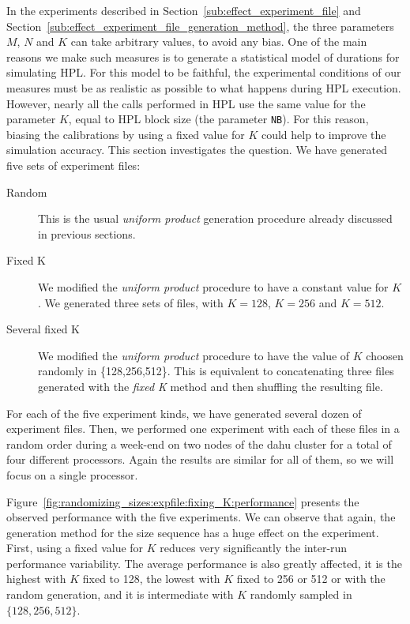             In the experiments described in Section~\ref{sub:effect_experiment_file} and
            Section~\ref{sub:effect_experiment_file_generation_method}, the three \dgemm parameters \(M\), \(N\) and
            \(K\) can take arbitrary values, to avoid any bias. One of the main reasons we make such measures is to
            generate a statistical model of \dgemm durations for simulating HPL. For this model to be faithful, the
            experimental conditions of our measures must be as realistic as possible to what happens during HPL
            execution. However, nearly all the \dgemm calls performed in HPL use the same value for the parameter \(K\),
            equal to HPL block size (\ie the parameter \texttt{NB}). For this reason, biasing the calibrations by using
            a fixed value for \(K\) could help to improve the simulation accuracy. This section investigates the
            question. We have generated five sets of experiment files:
            \begin{description}
                \item[Random] This is the usual \emph{uniform product} generation procedure already discussed in
                    previous sections.
                \item[Fixed K] We modified the \emph{uniform product} procedure to have a constant value for \(K\). We
                    generated three sets of files, with \(K=128\), \(K=256\) and \(K=512\).
                \item[Several fixed K] We modified the \emph{uniform product} procedure to have the value of \(K\)
                    choosen randomly in \{128,256,512\}. This is equivalent to concatenating three files generated with
                    the \emph{fixed K} method and then shuffling the resulting file.
            \end{description}
            For each of the five experiment kinds, we have generated several dozen of experiment files. Then, we
            performed one experiment with each of these files in a random order during a week-end on two nodes of the
            dahu cluster for a total of four different processors. Again the results are similar for all of them, so we
            will focus on a single processor.

            Figure~\ref{fig:randomizing_sizes:expfile:fixing_K:performance} presents the observed \dgemm performance
            with the five experiments. We can observe that again, the generation method for the size sequence has a huge
            effect on the experiment. First, using a fixed value for \(K\) reduces very significantly the inter-run
            performance variability. The average performance is also greatly affected, it is the highest with \(K\)
            fixed to 128, the lowest with \(K\) fixed to 256 or 512 or with the random generation, and it is
            intermediate with \(K\) randomly sampled in \(\{128,256,512\}\).

